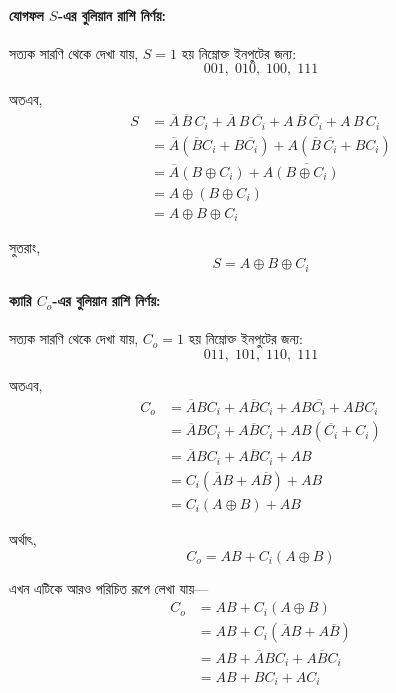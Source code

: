 
\paragraph{যোগফল \(S\)-এর বুলিয়ান রাশি নির্ণয়:}

সত্যক সারণি থেকে দেখা যায়, \(S=1\) হয় নিম্নোক্ত ইনপুটের জন্য:
\[
001,\;010,\;100,\;111
\]

অতএব,
\[
\begin{aligned}
S &=
\overline{A}\,\overline{B}\,C_i
+\overline{A}\,B\,\overline{C_i}
+A\,\overline{B}\,\overline{C_i}
+A\,B\,C_i \\[4pt]
&=
\overline{A}\left(\overline{B}C_i+B\overline{C_i}\right)
+A\left(\overline{B}\,\overline{C_i}+BC_i\right) \\[4pt]
&=
\overline{A}(B\oplus C_i)+A\overline{(B\oplus C_i)} \\[4pt]
&=
A\oplus(B\oplus C_i) \\[4pt]
&=
A\oplus B\oplus C_i
\end{aligned}
\]

সুতরাং,
\[
\boxed{S=A\oplus B\oplus C_i}
\]

\paragraph{ক্যারি \(C_o\)-এর বুলিয়ান রাশি নির্ণয়:}

সত্যক সারণি থেকে দেখা যায়, \(C_o=1\) হয় নিম্নোক্ত ইনপুটের জন্য:
\[
011,\;101,\;110,\;111
\]

অতএব,
\[
\begin{aligned}
C_o &=
\overline{A}BC_i
+A\overline{B}C_i
+AB\overline{C_i}
+ABC_i \\[4pt]
&=
\overline{A}BC_i
+A\overline{B}C_i
+AB(\overline{C_i}+C_i) \\[4pt]
&=
\overline{A}BC_i
+A\overline{B}C_i
+AB \\[4pt]
&=
C_i(\overline{A}B+A\overline{B})+AB \\[4pt]
&=
C_i(A\oplus B)+AB
\end{aligned}
\]

অর্থাৎ,
\[
\boxed{C_o=AB+C_i(A\oplus B)}
\]

এখন এটিকে আরও পরিচিত রূপে লেখা যায়—
\[
\begin{aligned}
C_o &= AB+C_i(A\oplus B) \\[4pt]
&= AB+C_i(\overline{A}B+A\overline{B}) \\[4pt]
&= AB+\overline{A}BC_i+A\overline{B}C_i \\[4pt]
&= AB+BC_i+AC_i
\end{aligned}
\]

